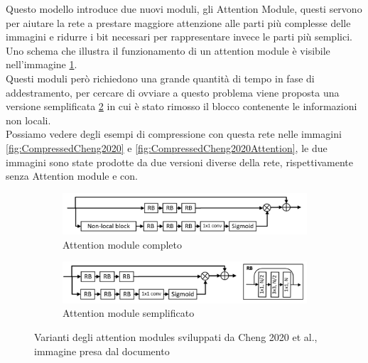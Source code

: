 Questo modello introduce due nuovi moduli, gli Attention Module, questi servono per aiutare la rete a prestare maggiore attenzione alle parti più complesse delle immagini e ridurre i bit necessari per rappresentare invece le parti più semplici. Uno schema che illustra il funzionamento di un attention module è visibile nell’immagine \ref{fig:cheng2020AttnModuleA}.\\
Questi moduli però richiedono una grande quantità di tempo in fase di addestramento, per cercare di ovviare a questo problema viene proposta una versione semplificata \ref{fig:cheng2020AttnModuleB} in cui è stato rimosso il blocco contenente le informazioni non locali.\\
Possiamo vedere degli esempi di compressione con questa rete nelle immagini \ref{fig:CompressedCheng2020} e \ref{fig:CompressedCheng2020Attention}, le due immagini sono state prodotte da due versioni diverse della rete, rispettivamente senza Attention module e con.\\
\newpage
\begin{figure}[h!]
    \centering
    \begin{subfigure}[]{0.6\textwidth}
        \includegraphics[width=\textwidth]{Immagini/Cheng2020_AttnModuleA.png}
        \caption{Attention module completo}
        \label{fig:cheng2020AttnModuleA}
    \end{subfigure}
    \vspace*{1.5cm}
    \begin{subfigure}[]{0.6\textwidth}
        \includegraphics[width=\textwidth]{Immagini/Cheng2020_AttnModuleB.png}
        \caption{Attention module semplificato}
        \label{fig:cheng2020AttnModuleB}
    \end{subfigure}
    \caption{Varianti degli attention modules sviluppati da Cheng 2020 et al., immagine presa dal documento \cite{cheng2020learned}}
    \label{fig:cheng2020AttnModule}
\end{figure}

